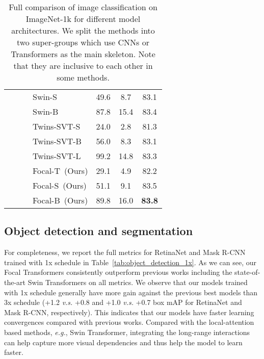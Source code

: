 \documentclass{article}
\begin{document}
\begin{table}[!ht]
{\begin{tabular}{cccl|ccc}
    & & & Swin-S~\cite{liu2021swin}   &  49.6 & 8.7  & 83.1 \\ 
    & & & Swin-B~\cite{liu2021swin}   &  87.8 & 15.4  &  83.4 \\
    & &  
        & Twins-SVT-S~\cite{chu2021twins} & 24.0 & 2.8 & 81.3 \\
    & & & Twins-SVT-B~\cite{chu2021twins} & 56.0 & 8.3 & 83.1 \\
    & & & Twins-SVT-L~\cite{chu2021twins} & 99.2 & 14.8 & 83.3 \\
    & & & Focal-T~(Ours)        & 29.1 & 4.9 & 82.2 \\
    & & & Focal-S~(Ours)        & 51.1 & 9.1 & 83.5 \\
    & & & Focal-B~(Ours)        & 89.8 & 16.0 & \textbf{83.8} \\
\bottomrule
    \end{tabular}
    }
    \caption{Full comparison of image classification on ImageNet-1k for different model architectures. We split the methods into two super-groups which use CNNs or Transformers as the main skeleton. Note that they are inclusive to each other in some methods.}
    \vspace{-10pt}
    \label{tab:full_image_classification}
\end{table}



\subsection{Object detection and segmentation}

For completeness, we report the full metrics for RetinaNet and Mask R-CNN trained with 1x schedule in Table~\ref{tab:object_detection_1x}. As we can see, our Focal Transformers consistently outperform previous works including the state-of-the-art Swin Transformers on all metrics. We observe that our models trained with 1x schedule generally have more gain against the previous best models than 3x schedule (+1.2 \textit{v.s.} +0.8 and +1.0 \textit{v.s.} +0.7 box mAP for RetinaNet and Mask R-CNN, respectively). This indicates that our models have faster learning convergences compared with previous works. Compared with the local-attention based methods, \textit{e.g.}, Swin Transformer, integrating the long-range interactions can help capture more visual dependencies and thus help the model to learn faster.
\end{document}
